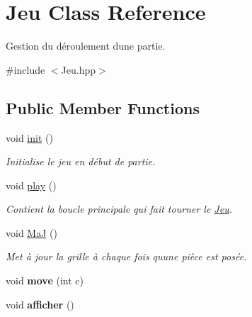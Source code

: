 \hypertarget{class_jeu}{}\section{Jeu Class Reference}
\label{class_jeu}


Gestion du déroulement d\textquotesingle{}une partie.  




{\ttfamily \#include $<$Jeu.\+hpp$>$}

\subsection*{Public Member Functions}
\begin{DoxyCompactItemize}
\item 
\mbox{\label{class_jeu_af8832b6cdb31f97f5dec8ed4e38a5200}} 
void \hyperlink{class_jeu_af8832b6cdb31f97f5dec8ed4e38a5200}{init} ()
\begin{DoxyCompactList}\small\item\em Initialise le jeu en début de partie. \end{DoxyCompactList}\item 
\mbox{\label{class_jeu_ad339f827f08dabcb27a90844822b268e}} 
void \hyperlink{class_jeu_ad339f827f08dabcb27a90844822b268e}{play} ()
\begin{DoxyCompactList}\small\item\em Contient la boucle principale qui fait tourner le \hyperlink{class_jeu}{Jeu}. \end{DoxyCompactList}\item 
\mbox{\label{class_jeu_a16a1b627ca2c860ab3e6ed90111619d0}} 
void \hyperlink{class_jeu_a16a1b627ca2c860ab3e6ed90111619d0}{MaJ} ()
\begin{DoxyCompactList}\small\item\em Met à jour la grille à chaque fois qu\textquotesingle{}une pièce est posée. \end{DoxyCompactList}\item 
\mbox{\label{class_jeu_afe5b195769def6b3fdffea8ecf2b090a}} 
void {\bfseries move} (int c)
\item 
\mbox{\label{class_jeu_a54a25003d167335db122efb513f6508f}} 
void {\bfseries afficher} ()
\end{DoxyCompactItemize}


